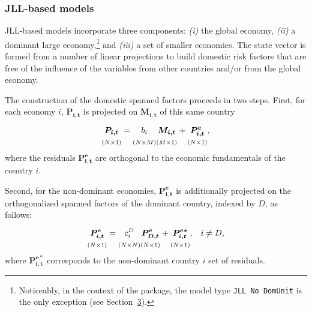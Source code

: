 \subsubsection{JLL-based models}\label{S:JLL}

JLL-based models incorporate three components: \emph{(i)} the global economy, \emph{(ii)} a dominant large economy,\footnote{Noticeably, in the context of the  package, the model type \texttt{JLL\ No\ DomUnit} is the only exception (see Section~\hyperref[S:ATSMoptions]{3}).} and \emph{(iii)} a set of smaller economies. The state vector is formed from a number of linear projections to build domestic risk factors that are free of the influence of the variables from other countries and/or from the global economy.

The construction of the domestic spanned factors proceeds in two steps. First, for each economy \(i\), \(\boldsymbol{P_{i,t}}\) is projected on \(\boldsymbol{M_{i,t}}\) of this same country
\begin{equation}
    \underset{ (N \times 1)}{\vphantom{\Big|}
    \boldsymbol{P_{i,t}}} =
    \underset{(N \times M)}{\vphantom{\Big|}
    b_i}
    \underset{(M \times 1)}{\vphantom{\Big|}
    \boldsymbol{M_{i,t}}} +
    \underset{ (N \times 1)}{\vphantom{\Big|}
    \boldsymbol{P_{i,t}^e}} \text{,}
\label{eq:PricingOrthoAll}
\end{equation}
where the residuals \(\boldsymbol{P_{i,t}^e}\) are orthogonal to the economic fundamentals of the country \(i\).

Second, for the non-dominant economies, \(\boldsymbol{P_{i,t}^e}\) is additionally projected on the orthogonalized spanned factors of the dominant country, indexed by \(D\), as follows:
\begin{equation}
    \underset{(N \times 1)}{\vphantom{\Big|}
    \boldsymbol{P_{i,t}^e}} =
    \underset{(N \times N)}{\vphantom{\Big|}
    c_i^D}
    \underset{(N \times 1)}{\vphantom{\Big|}
    \boldsymbol{P_{D,t}^e}} +
    \underset{(N \times 1)}{\vphantom{\Big|}
    \boldsymbol{P_{i,t}^{e*}}}\text{,} \quad  i \neq D,
\label{eq:PricingOrthoNonDU}
\end{equation}
where \(\boldsymbol{P_{i,t}^{e*}}\) corresponds to the non-dominant country \(i\) set of residuals.

